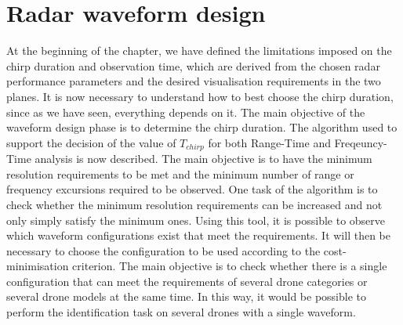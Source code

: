 \section{Radar waveform design}
At the beginning of the chapter, we have defined the limitations imposed on the chirp duration and observation time, which are derived from the chosen radar performance parameters and the desired visualisation requirements in the two planes. It is now necessary to understand how to best choose the chirp duration, since as we have seen, everything depends on it. The main objective of the waveform design phase is to determine the chirp duration. The algorithm used to support the decision of the value of $T_{chirp}$ for both Range-Time and Freqeuncy-Time analysis is now described. The main objective is to have the minimum resolution requirements to be met and the minimum number of range or frequency excursions required to be observed. One task of the algorithm is to check whether the minimum resolution requirements can be increased and not only simply satisfy the minimum ones. Using this tool, it is possible to observe which waveform configurations exist that meet the requirements. It will then be necessary to choose the configuration to be used according to the cost-minimisation criterion. The main objective is to check whether there is a single configuration that can meet the requirements of several drone categories or several drone models at the same time. In this way, it would be possible to perform the identification task on several drones with a single waveform.


